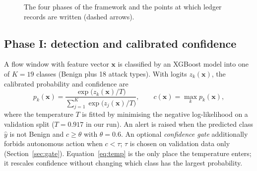 \documentclass[preprint,12pt]{elsarticle}
\begin{document}
\begin{figure}[htbp]
\caption{The four phases of the framework and the points at which ledger records are written (dashed arrows).}
\label{fig:phases}
\end{figure}

\subsection{Phase I: detection and calibrated confidence}
A flow window with feature vector $\mathbf{x}$ is classified by an XGBoost model into one of $K=19$ classes (Benign plus 18 attack types). With logits $z_k(\mathbf{x})$, the calibrated probability and confidence are
\begin{equation}
p_k(\mathbf{x}) = \frac{\exp\!\big(z_k(\mathbf{x})/T\big)}{\sum_{j=1}^{K}\exp\!\big(z_j(\mathbf{x})/T\big)},\qquad c(\mathbf{x}) = \max_k p_k(\mathbf{x}),
\label{eq:temp}
\end{equation}
where the temperature $T$ is fitted by minimising the negative log-likelihood on a validation split ($T=0.917$ in our run). An alert is raised when the predicted class $\hat y$ is not Benign and $c\ge\theta$ with $\theta=0.6$. An optional \emph{confidence gate} additionally forbids autonomous action when $c<\tau$; $\tau$ is chosen on validation data only (Section~\ref{sec:gate}). Equation~\eqref{eq:temp} is the only place the temperature enters; it rescales confidence without changing which class has the largest probability.
\end{document}
